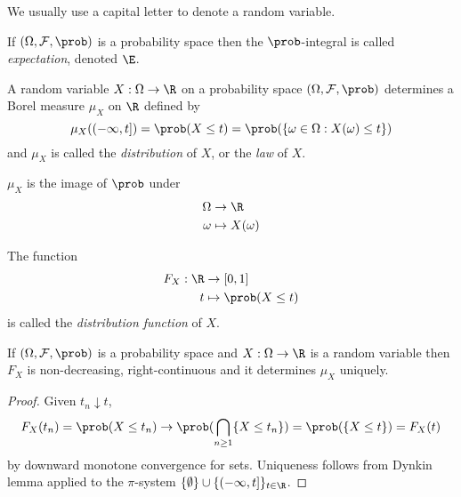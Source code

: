 \documentclass[a4paper]{article}
\renewcommand{\P}{\prob} %
\begin{document}
We usually use a capital letter to denote a random variable.

\begin{definition}[expectation]
  If \((\Omega, \mathcal F, \P)\) is a probability space then the \(\P\)-integral is called \emph{expectation}, denoted \(\E\).
\end{definition}

\begin{definition}
  A random variable \(X: \Omega \to \R\) on a probability space \((\Omega, \mathcal F, \P)\) determines a Borel measure \(\mu_X\) on \(\R\) defined by
  \[
    \mu_X((-\infty, t]) = \P(X \leq t) = \P(\{\omega \in \Omega: X(\omega) \leq t\})
  \]
  and \(\mu_X\) is called the \emph{distribution} of \(X\), or the \emph{law} of \(X\).
\end{definition}

\begin{note}
  \(\mu_X\) is the image of \(\P\) under
  \begin{align*}
    \Omega &\to \R \\
    \omega &\mapsto X(\omega)
  \end{align*}
\end{note}

\begin{definition}
  The function
  \begin{align*}
    F_X: \R &\to [0, 1] \\
    t &\mapsto \P(X \leq t)
  \end{align*}
  is called the \emph{distribution function} of \(X\).
\end{definition}

\begin{proposition}\leavevmode
  If \((\Omega, \mathcal F, \P)\) is a probability space and \(X: \Omega \to \R\) is a random variable then \(F_X\) is non-decreasing, right-continuous and it determines \(\mu_X\) uniquely.
\end{proposition}

\begin{proof}
  Given \(t_n \downarrow t\),
  \[
    F_X(t_n) = \P(X \leq t_n) \to \P(\bigcap_{n \geq 1} \{X \leq t_n\}) = \P(\{X \leq t\}) = F_X(t)
  \]
  by downward monotone convergence for sets. Uniqueness follows from Dynkin lemma applied to the \(\pi\)-system \(\{\emptyset\} \cup \{(-\infty, t]\}_{t \in \R}\).
\end{proof}
\end{document}
